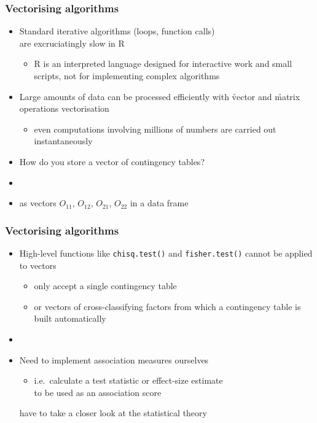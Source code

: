 \documentclass[t]{beamer} %
\begin{document}
\begin{frame}
  \frametitle{Vectorising algorithms}

  \begin{itemize}
  \item Standard iterative algorithms (loops, function calls)\\
    are excruciatingly slow in R
    \begin{itemize}
    \item R is an interpreted language designed for interactive work and small
      scripts, not for implementing complex algorithms
    \end{itemize}
  \item Large amounts of data can be processed efficiently with \h{vector} and
    \h{matrix} operations \so vectorisation
    \begin{itemize}
    \item even computations involving millions of numbers are carried out
      instantaneously
    \end{itemize}
  \item How do you store a vector of contingency tables?
  \item[]\pause
  \item[\hand] as vectors $O_{11}$, $O_{12}$, $O_{21}$, $O_{22}$ in a data frame
  \end{itemize}
\end{frame}

\begin{frame}
  \frametitle{Vectorising algorithms}

  \begin{itemize}
  \item High-level functions like \texttt{chisq.test()} and
    \texttt{fisher.test()} cannot be applied to vectors
    \begin{itemize}
    \item only accept a single contingency table
    \item or vectors of cross-classifying factors from which a contingency
      table is built automatically
    \end{itemize}
  \item[]\pause
  \item Need to implement association measures ourselves
    \begin{itemize}
    \item i.e.\ calculate a test statistic or effect-size estimate\\
      to be used as an association score
    \end{itemize}
    \so have to take a closer look at the statistical theory 
  \end{itemize}
\end{frame}
\end{document}
